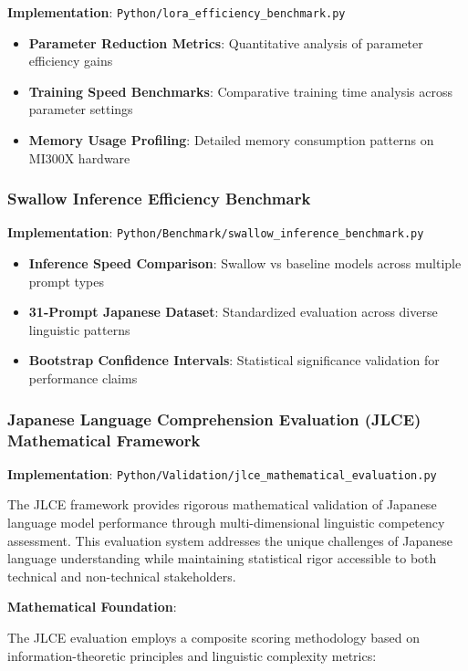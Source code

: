 \documentclass[12pt,a4paper]{article}
\begin{document}
\textbf{Implementation}: \texttt{Python/lora\_efficiency\_benchmark.py}

\begin{itemize}
\item \textbf{Parameter Reduction Metrics}: Quantitative analysis of parameter efficiency gains
\item \textbf{Training Speed Benchmarks}: Comparative training time analysis across parameter settings
\item \textbf{Memory Usage Profiling}: Detailed memory consumption patterns on MI300X hardware
\end{itemize}

\subsubsection{Swallow Inference Efficiency Benchmark}

\textbf{Implementation}: \texttt{Python/Benchmark/swallow\_inference\_benchmark.py}

\begin{itemize}
\item \textbf{Inference Speed Comparison}: Swallow vs baseline models across multiple prompt types
\item \textbf{31-Prompt Japanese Dataset}: Standardized evaluation across diverse linguistic patterns
\item \textbf{Bootstrap Confidence Intervals}: Statistical significance validation for performance claims
\end{itemize}

\subsubsection{Japanese Language Comprehension Evaluation (JLCE) Mathematical Framework}

\textbf{Implementation}: \texttt{Python/Validation/jlce\_mathematical\_evaluation.py}

The JLCE framework provides rigorous mathematical validation of Japanese language model performance through multi-dimensional linguistic competency assessment. This evaluation system addresses the unique challenges of Japanese language understanding while maintaining statistical rigor accessible to both technical and non-technical stakeholders.

\textbf{Mathematical Foundation}:

The JLCE evaluation employs a composite scoring methodology based on information-theoretic principles and linguistic complexity metrics:
\end{document}

